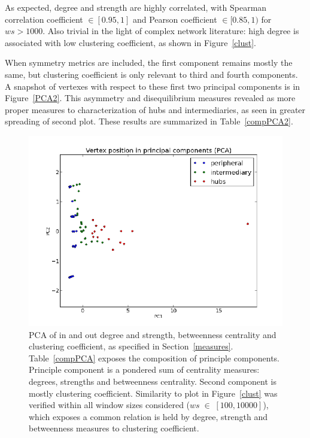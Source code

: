 \documentclass[%
 aip,
 jmp,%
 amsmath,amssymb,
 reprint,%
]{revtex4-1}
\begin{document}
As expected, degree and strength are highly correlated, with Spearman correlation coefficient $\in [0.95,1]$ and Pearson coefficient $\in [0.85,1)$ for $ws>1000$. Also trivial in the light of complex network literature: high degree is associated with low clustering coefficient, as shown in Figure~\ref{clust}.


When symmetry metrics are included, the first component remains mostly the same, but clustering coefficient is only relevant to third and fourth components. A snapshot of vertexes with respect to these first two principal components is in Figure~\ref{PCA2}. This asymmetry and disequilibrium measures revealed as more proper measures to characterization of hubs and intermediaries, as seen in greater spreading of second plot. These results are summarized in Table~\ref{compPCA2}.


\begin{figure} 
   \centering
        \includegraphics[width=\columnwidth]{figs/ev0pr3PCA}
    \caption{PCA of in and out degree and strength, betweenness centrality and clustering coefficient, as specified in Section~\ref{measures}. Table~\ref{compPCA} exposes the composition of principle components. Principle component is a pondered sum of centrality measures: degrees, strengths and betweenness centrality. Second component is mostly clustering coefficient. Similarity to plot in Figure~\ref{clust} was verified within all window sizes considered ($ws\;\in\;[100,10000]$), which exposes a common relation is held by degree, strength and betweenness measures to clustering coefficient.}
    \label{PCA}
\end{figure}
\end{document}
